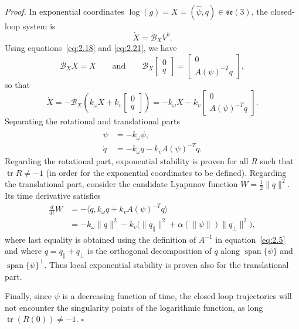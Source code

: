 \documentclass[11pt]{article}
\newcommand{\se}{\mathfrak{se}}
\newcommand{\tr}{\operatorname{tr}}
\newcommand{\calB}{\mathcal B}
\newcommand{\proofbox}{\hfill$\square$}
\begin{document}
\emph{Proof.} In exponential coordinates $\log(g)=X=(\widehat\psi,q)\in\se(3)$, the closed-loop system is
\begin{equation*}
\dot X=\calB_XV^b.
\end{equation*}
Using equations~\eqref{eq:2.18} and \eqref{eq:2.21}, we have
\begin{equation*}
\calB_XX=X\qquad\text{and}\qquad
\calB_X\begin{bmatrix}0\\q\end{bmatrix}=\begin{bmatrix}0\\A(\psi)^{-T}q\end{bmatrix},
\end{equation*}
so that
\begin{equation*}
\dot X=-\calB_X\left(k_\omega X+k_v\begin{bmatrix}0\\q\end{bmatrix}\right)
=-k_\omega X-k_v\begin{bmatrix}0\\A(\psi)^{-T}q\end{bmatrix}.
\end{equation*}
Separating the rotational and translational parts
\begin{align*}
\dot\psi &=-k_\omega\psi,\\
\dot q &=-k_\omega q-k_vA(\psi)^{-T}q.
\end{align*}
Regarding the rotational part, exponential stability is proven for all $R$ such that $\tr R\neq-1$ (in order for the exponential coordinates to be defined). Regarding the translational part, consider the candidate Lyapunov function $W=\tfrac12\|q\|^2$. Its time derivative satisfies
\begin{align*}
\frac{d}{dt}W&=-\langle q,k_\omega q+k_vA(\psi)^{-T}q\rangle\\
&=-k_\omega\|q\|^2-k_v\bigl(\|q_{\parallel}\|^2+\alpha(\|\psi\|)\|q_{\perp}\|^2\bigr),
\end{align*}
where last equality is obtained using the definition of $A^{-1}$ in equation~\eqref{eq:2.5} and where $q=q_{\parallel}+q_{\perp}$ is the orthogonal decomposition of $q$ along $\operatorname{span}\{\psi\}$ and $\operatorname{span}\{\psi\}^{\perp}$. Thus local exponential stability is proven also for the translational part.

Finally, since $\psi$ is a decreasing function of time, the closed loop trajectories will not encounter the singularity points of the logarithmic function, as long $\tr(R(0))\neq-1$. \proofbox
\end{document}
